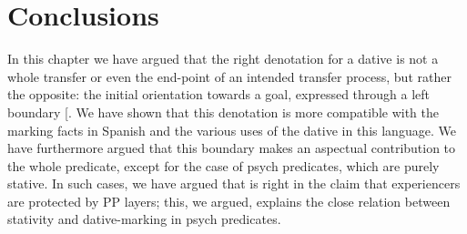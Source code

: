 \documentclass[output=paper,colorlinks,citecolor=brown,nonflat]{langsci/langscibook}
\begin{document}
\section{Conclusions}\label{sec:fabregas:4}

In this chapter we have argued that the right denotation for a dative is not a whole transfer or even the end-point of an intended transfer process, but rather the opposite: the initial orientation towards a goal, expressed through a left boundary [. We have shown that this denotation is more compatible with the marking facts in Spanish and the various uses of the dative in this language. We have furthermore argued that this boundary makes an aspectual contribution to the whole predicate, except for the case of psych predicates, which are purely stative. In such cases, we have argued that \citet{Landau2010} is right in the claim that experiencers are protected by PP layers; this, we argued, explains the close relation between stativity and dative-marking in psych predicates.

\sloppy\printbibliography[heading=subbibliography,notkeyword=this]
\end{document}
